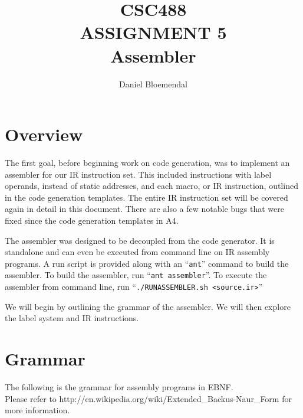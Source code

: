 \documentclass[oneside]{amsart}
\theoremstyle{definition}
\theoremstyle{remark}
\numberwithin{equation}{section}
\begin{document}
\title[CSC488 A5]{CSC488\\ASSIGNMENT 5\\Assembler}
\author{Daniel Bloemendal}

\begin{titlepage}
\maketitle
\thispagestyle{empty}
\tableofcontents
\end{titlepage}

\section{Overview}
The first goal, before beginning work on code generation, was to implement an assembler for our IR
instruction set. This included instructions with label operands, instead of static addresses, and
each macro, or IR instruction, outlined in the code generation templates. The entire IR instruction
set will be covered again in detail in this document. There are also a few notable bugs that were
fixed since the code generation templates in A4.

The assembler was designed to be decoupled from the code generator. It is standalone and can even be
executed from command line on IR assembly programs. A run script is provided along with an
``\texttt{ant}'' command to build the assembler. To build the assembler, run
``\texttt{ant assembler}''. To execute the assembler from command line, run
``\texttt{./RUNASSEMBLER.sh <source.ir>}''

We will begin by outlining the grammar of the assembler. We will then explore the label system and
IR instructions.

\section{Grammar}
\noindent The following is the grammar for assembly programs in EBNF. \\
Please refer to http://en.wikipedia.org/wiki/Extended_Backus-Naur_Form for more information. \\
\end{document}
